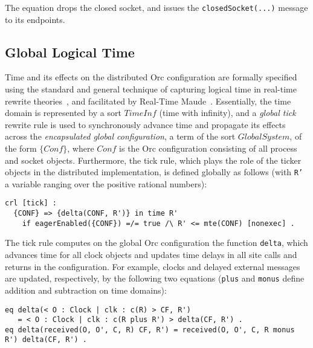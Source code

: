 \documentclass{eptcs}
\begin{document}
\noindent The equation drops the closed socket, and issues the \texttt{closedSocket(...)} message to its endpoints.
  

\subsection{Global Logical Time} \label{sec:global-logical-time}

Time and its effects on the distributed Orc configuration are formally specified using the standard and general technique of capturing logical time in real-time rewrite theories~\cite{RTTheories05}, and facilitated by Real-Time Maude~\cite{RTMManual07}. Essentially, the time domain is represented by a sort $\mathit{TimeInf}$ (time with infinity), and a \emph{global tick} rewrite rule is used to synchronously advance time and propagate its effects across the \emph{encapsulated global configuration}, a term of the sort $\mathit{GlobalSystem}$, of the form $\{ \mathit{Conf} \}$, where $\mathit{Conf}$ is the Orc configuration consisting of all process and socket objects. Furthermore, the tick rule, which plays the role of the ticker objects in the distributed implementation, is defined globally as follows (with \texttt{R'} a variable ranging over the positive rational numbers): 

\begin{small}
\begin{verbatim}
crl [tick] : 
  {CONF} => {delta(CONF, R')} in time R'
    if eagerEnabled({CONF}) =/= true /\ R' <= mte(CONF) [nonexec] .
\end{verbatim}
\end{small}

\noindent The tick rule computes on the global Orc configuration the function \texttt{delta}, which advances time for all clock objects and updates time delays in all site calls and returns in the configuration. For example, clocks and delayed external messages are updated, respectively, by the following two equations (\texttt{plus} and \texttt{monus} define addition and subtraction on time domains):

\begin{small}
\begin{verbatim}
eq delta(< O : Clock | clk : c(R) > CF, R') 
   = < O : Clock | clk : c(R plus R') > delta(CF, R') . 
eq delta(received(O, O', C, R) CF, R') = received(O, O', C, R monus R') delta(CF, R') .
\end{verbatim}
\end{small}
\end{document}
